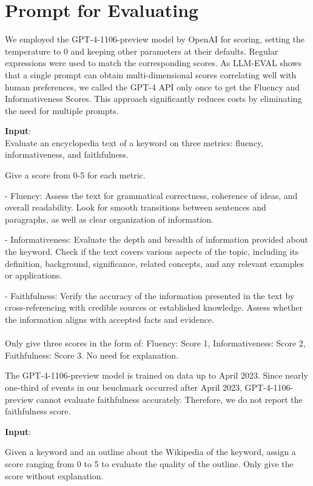 \section{Prompt for Evaluating}
\label{evaluation-appendix}
We employed the GPT-4-1106-preview model by OpenAI for scoring, setting the temperature to 0 and keeping other parameters at their defaults. Regular expressions were used to match the corresponding scores. As LLM-EVAL\citep{lin-chen-2023-llm} shows that a single prompt can obtain multi-dimensional scores correlating well with human preferences, we called the GPT-4 API only once to get the Fluency and Informativeness Scores. This approach significantly reduces costs by eliminating the need for multiple prompts.
\begin{tcolorbox}[title = {Evaluation Prompt for Fluent Score and Informativeness Score}]

\textbf{Input}: \\
Evaluate an encyclopedia text of a keyword on three metrics: fluency, informativeness, and faithfulness.

Give a score from 0-5 for each metric. 

- Fluency: Assess the text for grammatical correctness, coherence of ideas, and overall readability. Look for smooth transitions between sentences and paragraphs, as well as clear organization of information.

- Informativeness: Evaluate the depth and breadth of information provided about the keyword. Check if the text covers various aspects of the topic, including its definition, background, significance, related concepts, and any relevant examples or applications.

- Faithfulness: Verify the accuracy of the information presented in the text by cross-referencing with credible sources or established knowledge. Assess whether the information aligns with accepted facts and evidence.\\\\

Only give three scores in the form of: Fluency: Score 1, Informativeness: Score 2, Faithfulness: Score 3. No need for explanation.
\end{tcolorbox}

The GPT-4-1106-preview model is trained on data up to April 2023. Since nearly one-third of events in our benchmark occurred after April 2023, GPT-4-1106-preview cannot evaluate faithfulness accurately. Therefore, we do not report the faithfulness score.
\begin{tcolorbox}[title = {Evaluation Prompt for Outline Score}]

\textbf{Input}:

Given a keyword and an outline about the Wikipedia of the keyword, assign a score ranging from 0 to 5 to evaluate the quality of the outline. Only give the score without explanation.
\end{tcolorbox}

